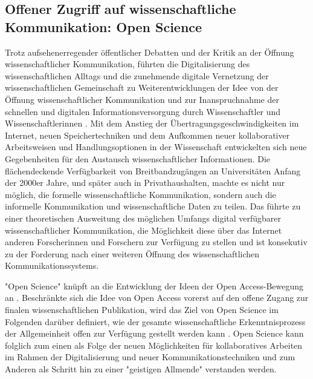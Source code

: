 \subsection{Offener Zugriff auf wissenschaftliche Kommunikation: Open Science}

Trotz aufsehenerregender öffentlicher Debatten und der Kritik an der Öffnung wissenschaftlicher Kommunikation, führten die Digitalisierung des wissenschaftlichen Alltags und die zunehmende digitale Vernetzung der wissenschaftlichen Gemeinschaft zu Weiterentwicklungen der Idee von der Öffnung wissenschaftlicher Kommunikation und zur Inanspruchnahme der schnellen und digitalen Informationsversorgung durch Wissenschaftler und Wissenschaftlerinnen \cite{winkler_2011_anforderungen}. Mit dem Anstieg der Übertragungsgeschwindigkeiten im Internet, neuen Speichertechniken und dem Aufkommen neuer kollaborativer Arbeitsweisen und Handlungsoptionen in der Wissenschaft entwickelten sich neue Gegebenheiten für den Austausch wissenschaftlicher Informationen. Die flächendeckende Verfügbarkeit von Breitbandzugängen an Universitäten Anfang der 2000er Jahre, und später auch in Privathaushalten, machte es nicht nur möglich, die formelle wissenschaftliche  Kommunikation, sondern auch die informelle Kommunikation und wissenschaftliche Daten zu teilen. Das führte zu einer theoretischen Ausweitung des möglichen Umfangs digital verfügbarer wissenschaftlicher Kommunikation, die Möglichkeit diese über das Internet anderen Forscherinnen und Forschern zur Verfügung zu stellen und ist konsekutiv zu der Forderung nach einer weiteren Öffnung des wissenschaftlichen Kommunikationssystems.

"Open Science" knüpft an die Entwicklung der Ideen der Open Access-Bewegung an \cite{garcia_2010_open}. Beschränkte sich die Idee von Open Access vorerst auf den offene Zugang zur finalen wissenschaftlichen Publikation, wird das Ziel von Open Science im Folgenden darüber definiert, wie der gesamte wissenschaftliche Erkenntnisprozess der Allgemeinheit offen zur Verfügung gestellt werden kann \cite{grand_2012_open}. Open Science kann folglich zum einen als Folge der neuen Möglichkeiten für kollaboratives Arbeiten im Rahmen der Digitalisierung und neuer Kommunikationstechniken und zum Anderen als Schritt hin zu einer "geistigen Allmende" \cite{naeder_2010_open} verstanden werden.

